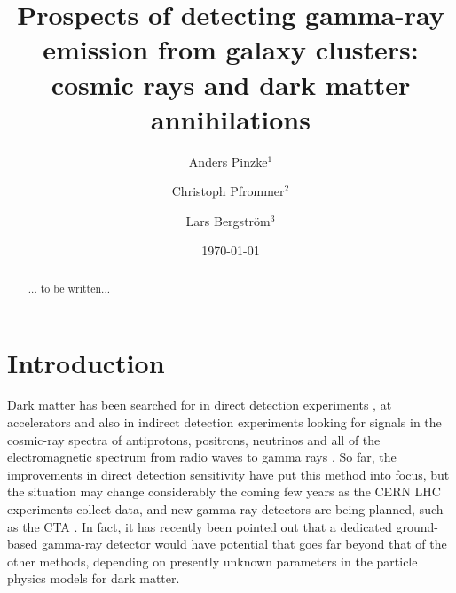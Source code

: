 \documentclass[10pt,aps,pra,reprint,amsmath,amsfonts,amssymb,showpacs]{revtex4-1}
\begin{document}
\title{Prospects of detecting gamma-ray emission from galaxy clusters:
  cosmic rays and dark matter annihilations}

\author{Anders Pinzke$^{1}$}  
\author{Christoph Pfrommer$^{2}$}
\author{Lars Bergstr\"om$^{3}$}





\date{\today}



\begin{abstract}
... to be written...
\end{abstract}

\maketitle
\section{Introduction}

Dark matter has been searched for in direct detection experiments
\cite{Pato:2010zk}, at accelerators
\cite{Ellis:2001hv,Baer:2006ff,Khachatryan:2011tk} and also in
indirect detection experiments looking for signals in the cosmic-ray
spectra of antiprotons, positrons, neutrinos and all of the
electromagnetic spectrum from radio waves to gamma rays
\cite{Bergstrom:2009ib}. So far, the improvements in direct detection
sensitivity have put this method into focus, but the situation may
change considerably the coming few years as the CERN LHC experiments
collect data, and new gamma-ray detectors are being planned, such as
the CTA \cite{Consortium:2010bc}. In fact, it has recently been
pointed out \cite{Bergstrom:2010gh} that a dedicated ground-based
gamma-ray detector would have potential that goes far beyond that of
the other methods, depending on presently unknown parameters in the
particle physics models for dark matter.
\end{document}
